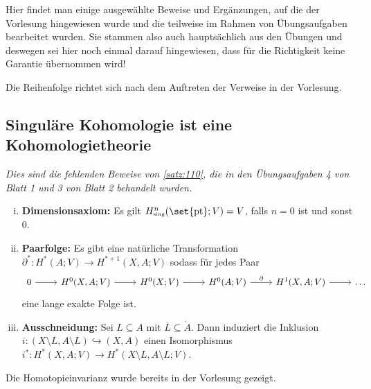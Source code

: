 Hier findet man einige ausgewählte Beweise und Ergänzungen, auf die der Vorlesung hingewiesen wurde und die teilweise im Rahmen von Übungsaufgaben bearbeitet wurden.
Sie stammen also auch hauptsächlich aus den Übungen und deswegen sei hier noch einmal darauf hingewiesen, dass für die Richtigkeit keine Garantie übernommen wird!

Die Reihenfolge richtet sich nach dem Auftreten der Verweise in der Vorlesung.

\subsection{Singuläre Kohomologie ist eine Kohomologietheorie} %
\label{sub:sing_kohomo}
\emph{Dies sind die fehlenden Beweise von \autoref{satz:110}, die in den Übungsaufgaben 4 von Blatt 1 und 3 von Blatt 2 behandelt wurden.}
\begin{enumerate}[i),itemsep=1.5pt]
	\item \textbf{Dimensionsaxiom:} Es gilt $H^n_\sing(\set{\pt};V) = V$, falls $n=0$ ist und sonst $0$.
	\item \textbf{Paarfolge:} Es gibt eine natürliche Transformation $\partial^*\colon H^*(A;V) \to H^{*+1}(X,A;V)$ sodass für jedes Paar 
	\[
		\begin{tikzcd}
			0 \rar & H^0(X,A;V) \rar & H^0(X;V) \rar & H^0(A;V) \rar["\partial"] & H^1(X,A;V) \rar & \ldots 
		\end{tikzcd}
	\]
	eine lange exakte Folge ist.
	\item \textbf{Ausschneidung:} Sei $L \subseteq A$ mit $\overline{L} \subseteq \mathring{A}$. 
	Dann induziert die Inklusion $i \colon (X \setminus L, A \setminus L) \hookrightarrow (X,A)$ einen Isomorphismus $i^* \colon H^*(X,A;V) \to H^*(X \setminus L, A \setminus L;V)$.
\end{enumerate}
Die Homotopieinvarianz wurde bereits in der Vorlesung gezeigt.

